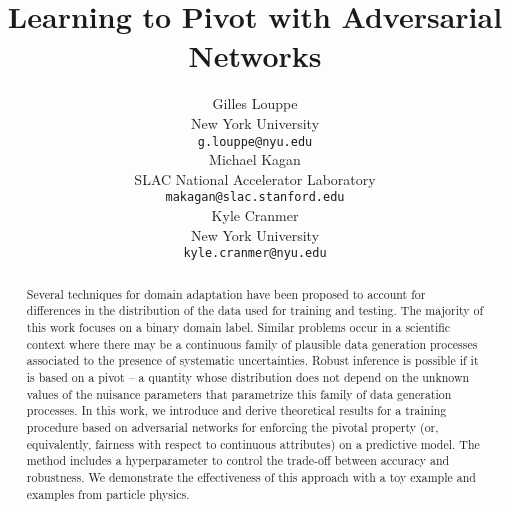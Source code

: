 \documentclass{article}
\title{Learning to Pivot with Adversarial Networks}
\author{
  Gilles Louppe\\
  New York University\\
  \texttt{g.louppe@nyu.edu}\\
  \And
  Michael Kagan\\
  SLAC National Accelerator Laboratory\\
  \texttt{makagan@slac.stanford.edu}\\
  \And
  Kyle Cranmer\\
  New York University\\
  \texttt{kyle.cranmer@nyu.edu}
}
\theoremstyle{plain}
\begin{document}

\maketitle

\begin{abstract}

Several techniques for domain adaptation have been proposed to account for
differences in the distribution of the data used for training and testing. The
majority of this work focuses on a binary domain label. Similar problems occur
in a scientific context where there may be a continuous family of plausible data
generation processes associated to the presence of systematic uncertainties.
Robust inference is possible if it is based on a pivot -- a quantity whose
distribution does not depend on the unknown values of the nuisance parameters
that parametrize this family of data generation processes. In this work,  we
introduce and derive theoretical results for a training procedure based on
adversarial networks for enforcing the pivotal property (or, equivalently,
fairness with respect to continuous attributes) on a predictive model. The
method includes a hyperparameter to control the trade-off between accuracy and
robustness. We demonstrate the effectiveness of this approach with a toy example
and examples from particle physics.

\end{abstract}


\end{document}
